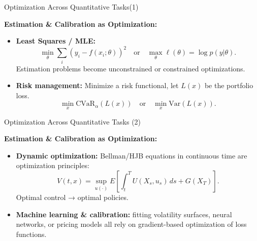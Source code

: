 \documentclass[aspectratio=169]{beamer}
\begin{document}

\begin{frame}{Optimization Across Quantitative Tasks(1)}

\textbf{Estimation \& Calibration as Optimization:}

\begin{itemize}
  \item \textbf{Least Squares / MLE:}
  \[
  \min_{\theta} \sum_{i}(y_i - f(x_i;\theta))^2
  \quad \text{or} \quad
  \max_{\theta} \ell(\theta)=\log p(y|\theta).
  \]
  Estimation problems become unconstrained or constrained optimizations.

  \vspace{0.5em}
\pause
  \item \textbf{Risk management:}  
  Minimize a risk functional, let \(L(x)\) be the portfolio loss.
  \[
  \min_{x} \text{CVaR}_\alpha(L(x))
  \quad \text{or} \quad
  \min_x \text{Var}(L(x))  
  .\]

\end{itemize}

\end{frame}

\begin{frame}{Optimization Across Quantitative Tasks (2)}

\textbf{Estimation \& Calibration as Optimization:}

\begin{itemize}

  \item \textbf{Dynamic optimization:}  
  Bellman/HJB equations in continuous time are optimization principles:
  \[
  V(t,x)=\sup_{u(\cdot)} E\!\left[\int_t^T U(X_s,u_s)\,ds + G(X_T)\right].
  \]
  Optimal control → optimal policies.
\pause
  \vspace{0.5em}

  \item \textbf{Machine learning \& calibration:}  
  fitting volatility surfaces, neural networks, or pricing models  
  all rely on gradient-based optimization of loss functions.

\end{itemize}

\end{frame}
\end{document}
